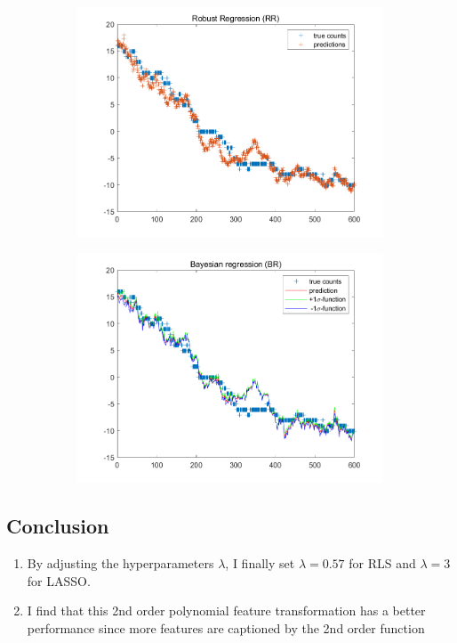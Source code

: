 \documentclass{article}
\begin{document}
\begin{figure}[H]
\begin{subfigure}[b]{0.475\textwidth}
        \includegraphics[width=\textwidth]{fig/2b-rr.png} 
    \end{subfigure}
    \quad
    \begin{subfigure}[b]{0.475\textwidth}   
        \centering 
        \includegraphics[width=\textwidth]{fig/2b-br.png} 
    \end{subfigure}
\end{figure}

\subsection*{Conclusion}
\begin{enumerate}[label=(\roman*)]
    \item By adjusting the hyperparameters $\lambda$, I finally set $\lambda = 0.57$ for RLS and $\lambda = 3$ for LASSO.
    \item I find that this 2nd order polynomial feature transformation has a better performance since more features are captioned by the 2nd order function
\end{enumerate}
\end{document}
